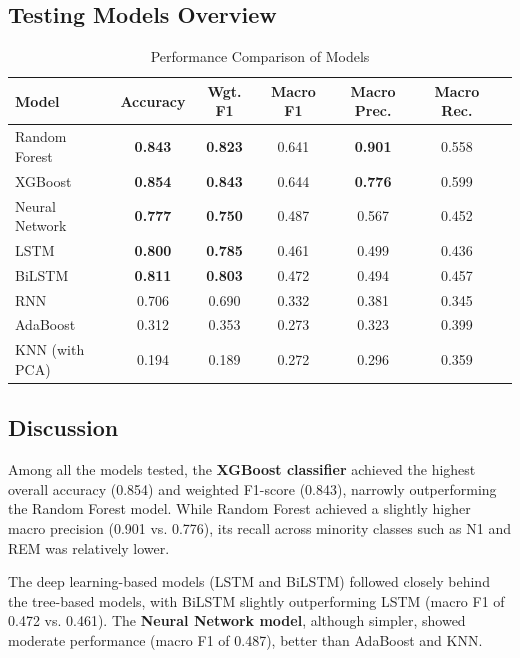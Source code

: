\subsection{Testing  Models Overview}



\begin{table}[H]
	\centering
	\caption{Performance Comparison of Models}
	\label{tab:metrics_summary}
	\begin{tabular}{lcccccc}
		\hline
		\textbf{Model} & \textbf{Accuracy} & \textbf{Wgt. F1} & \textbf{Macro F1} & \textbf{Macro Prec.} & \textbf{Macro Rec.} \\
		\hline
		Random Forest          & \textbf{0.843} & \textbf{0.823} & 0.641 & \textbf{0.901} & 0.558 \\
		XGBoost                & \textbf{0.854} & \textbf{0.843} & 0.644 & \textbf{0.776} & 0.599 \\
		Neural Network         & \textbf{0.777} & \textbf{0.750} & 0.487 & 0.567 & 0.452 \\
		LSTM                   & \textbf{0.800} & \textbf{0.785} & 0.461 & 0.499 & 0.436 \\
		BiLSTM                 & \textbf{0.811} & \textbf{0.803} & 0.472 & 0.494 & 0.457 \\
		RNN                    & 0.706 & 0.690 & 0.332 & 0.381 & 0.345 \\
		AdaBoost               & 0.312 & 0.353 & 0.273 & 0.323 & 0.399 \\
		KNN (with PCA)         & 0.194 & 0.189 & 0.272 & 0.296 & 0.359 \\
		\hline
	\end{tabular}
\end{table}


\subsection{Discussion}

Among all the models tested, the \textbf{XGBoost classifier} achieved the highest overall accuracy (0.854) and weighted F1-score (0.843), narrowly outperforming the Random Forest model. While Random Forest achieved a slightly higher macro precision (0.901 vs. 0.776), its recall across minority classes such as N1 and REM was relatively lower.

The deep learning-based models (LSTM and BiLSTM) followed closely behind the tree-based models, with BiLSTM slightly outperforming LSTM (macro F1 of 0.472 vs. 0.461). The \textbf{Neural Network model}, although simpler, showed moderate performance (macro F1 of 0.487), better than AdaBoost and KNN.

